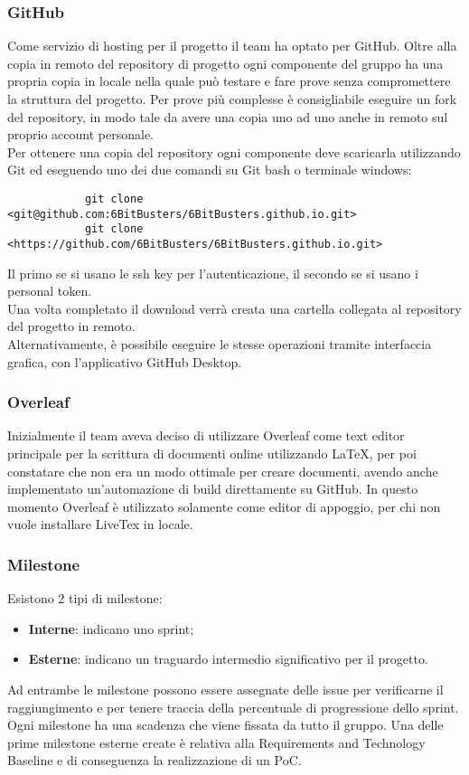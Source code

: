 \subsubsection{GitHub}
Come servizio di hosting per il progetto il team ha optato per GitHub. Oltre
alla copia in remoto del repository di progetto ogni componente del gruppo ha
una propria copia in locale nella quale può testare e fare prove senza
compromettere la struttura del progetto. Per prove più complesse è
consigliabile eseguire un fork del repository, in modo tale da avere una copia
uno ad uno anche in remoto sul proprio account personale.\\ Per ottenere una
copia del repository ogni componente deve scaricarla utilizzando Git ed
eseguendo uno dei due comandi su Git bash o terminale windows:
\begin{verbatim}
            git clone <git@github.com:6BitBusters/6BitBusters.github.io.git>
            git clone <https://github.com/6BitBusters/6BitBusters.github.io.git>
        \end{verbatim}
Il primo se si usano le ssh key per l'autenticazione, il secondo se si usano i
personal token.\\ Una volta completato il download verrà creata una cartella
collegata al repository del progetto in remoto.\\ Alternativamente, è possibile
eseguire le stesse operazioni tramite interfaccia grafica, con l'applicativo
GitHub Desktop.

\subsubsection{Overleaf}
Inizialmente il team aveva deciso di utilizzare Overleaf come text editor
principale per la scrittura di documenti online utilizzando LaTeX, per poi
constatare che non era un modo ottimale per creare documenti, avendo anche
implementato un'automazione di build direttamente su GitHub. In questo momento
Overleaf è utilizzato solamente come editor di appoggio, per chi non vuole
installare LiveTex in locale.

\subsubsection{Milestone}
Esistono 2 tipi di milestone:
\begin{itemize}
    \item \textbf{Interne}: indicano uno sprint;
    \item \textbf{Esterne}: indicano un traguardo intermedio significativo per il progetto.
\end{itemize}
Ad entrambe le milestone possono essere assegnate delle issue per verificarne il raggiungimento e per tenere traccia
della percentuale di progressione dello sprint.
Ogni milestone ha una scadenza che viene fissata da tutto il gruppo. Una delle prime milestone esterne create è
relativa alla Requirements and Technology Baseline e di conseguenza la realizzazione di un PoC.

